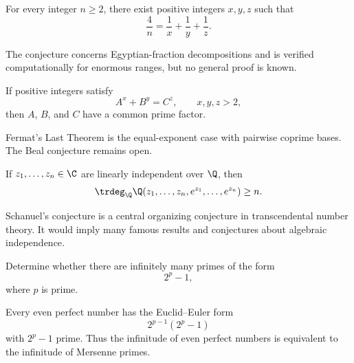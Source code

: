     \begin{conjecture}
        For every integer $n\geq 2$, there exist positive integers $x,y,z$ such that
        \[
            \frac{4}{n}
            =
            \frac{1}{x}+\frac{1}{y}+\frac{1}{z}.
        \]
    \end{conjecture}

    \begin{remark}
        The conjecture concerns Egyptian-fraction decompositions and is verified
        computationally for enormous ranges, but no general proof is known.
    \end{remark}

    \begin{conjecture}
        If positive integers satisfy
        \[
            A^x+B^y=C^z,
            \qquad
            x,y,z>2,
        \]
        then $A$, $B$, and $C$ have a common prime factor.
    \end{conjecture}

    \begin{remark}
        Fermat's Last Theorem is the equal-exponent case with pairwise coprime
        bases. The Beal conjecture remains open.
    \end{remark}

    \begin{conjecture}
        If $z_1,\dots,z_n\in\C$ are linearly independent over $\Q$, then
        \[
            \trdeg_{\Q}
            \Q(z_1,\dots,z_n,e^{z_1},\dots,e^{z_n})
            \geq n.
        \]
    \end{conjecture}

    \begin{remark}
        Schanuel's conjecture is a central organizing conjecture in
        transcendental number theory. It would imply many famous results and
        conjectures about algebraic independence.
    \end{remark}

    \begin{openproblem}
        Determine whether there are infinitely many primes of the form
        \[
            2^p-1,
        \]
        where $p$ is prime.
    \end{openproblem}

    \begin{remark}
        Every even perfect number has the Euclid--Euler form
        \[
            2^{p-1}(2^p-1)
        \]
        with $2^p-1$ prime. Thus the infinitude of even perfect numbers is
        equivalent to the infinitude of Mersenne primes.
    \end{remark}

